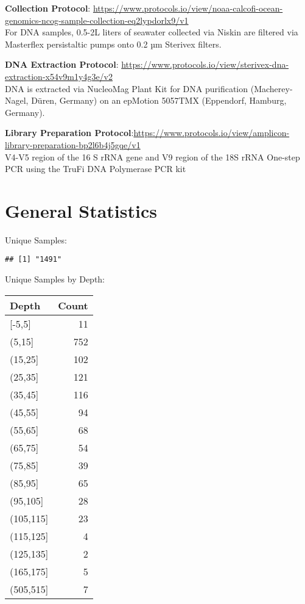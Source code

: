 \documentclass[
]{article}
\begin{document}
\textbf{Collection Protocol}:
\url{https://www.protocols.io/view/noaa-calcofi-ocean-genomics-ncog-sample-collection-eq2lypdorlx9/v1}\\
For DNA samples, 0.5-2L liters of seawater collected via Niskin are
filtered via Masterflex persistaltic pumps onto 0.2 µm Sterivex filters.

\textbf{DNA Extraction Protocol}:
\url{https://www.protocols.io/view/sterivex-dna-extraction-x54v9m1y4g3e/v2}\\
DNA is extracted via NucleoMag Plant Kit for DNA purification
(Macherey-Nagel, Düren, Germany) on an epMotion 5057TMX (Eppendorf,
Hamburg, Germany).

\textbf{Library Preparation
Protocol}:\url{https://www.protocols.io/view/amplicon-library-preparation-bp2l6b4j5gqe/v1}\\
V4-V5 region of the 16 S rRNA gene and V9 region of the 18S rRNA
One-step PCR using the TruFi DNA Polymerase PCR kit

\hypertarget{general-statistics}{%
\section{General Statistics}\label{general-statistics}}

Unique Samples:

\begin{verbatim}
## [1] "1491"
\end{verbatim}

Unique Samples by Depth:

\begin{longtable}[]{@{}lr@{}}
\toprule()
Depth & Count \\
\midrule()
\endhead
{[}-5,5{]} & 11 \\
(5,15{]} & 752 \\
(15,25{]} & 102 \\
(25,35{]} & 121 \\
(35,45{]} & 116 \\
(45,55{]} & 94 \\
(55,65{]} & 68 \\
(65,75{]} & 54 \\
(75,85{]} & 39 \\
(85,95{]} & 65 \\
(95,105{]} & 28 \\
(105,115{]} & 23 \\
(115,125{]} & 4 \\
(125,135{]} & 2 \\
(165,175{]} & 5 \\
(505,515{]} & 7 \\
\bottomrule()
\end{longtable}
\end{document}
